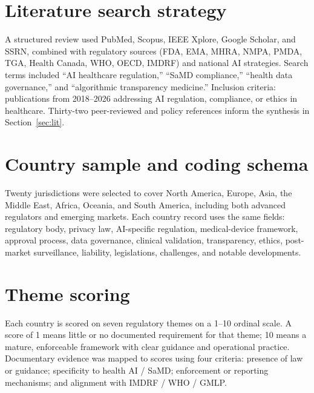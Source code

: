 \documentclass[12pt,a4paper]{report}
\begin{document}
\section{Literature search strategy}

A structured review used PubMed, Scopus, IEEE Xplore, Google Scholar, and SSRN, combined with regulatory sources (FDA, EMA, MHRA, NMPA, PMDA, TGA, Health Canada, WHO, OECD, IMDRF) and national AI strategies. Search terms included ``AI healthcare regulation,'' ``SaMD compliance,'' ``health data governance,'' and ``algorithmic transparency medicine.'' Inclusion criteria: publications from 2018--2026 addressing AI regulation, compliance, or ethics in healthcare. Thirty-two peer-reviewed and policy references inform the synthesis in Section~\ref{sec:lit}.

\section{Country sample and coding schema}

Twenty jurisdictions were selected to cover North America, Europe, Asia, the Middle East, Africa, Oceania, and South America, including both advanced regulators and emerging markets. Each country record uses the same fields: regulatory body, privacy law, AI-specific regulation, medical-device framework, approval process, data governance, clinical validation, transparency, ethics, post-market surveillance, liability, legislations, challenges, and notable developments.

\section{Theme scoring}

Each country is scored on seven regulatory themes on a 1--10 ordinal scale. A score of 1 means little or no documented requirement for that theme; 10 means a mature, enforceable framework with clear guidance and operational practice. Documentary evidence was mapped to scores using four criteria: presence of law or guidance; specificity to health AI / SaMD; enforcement or reporting mechanisms; and alignment with IMDRF / WHO / GMLP.
\end{document}
